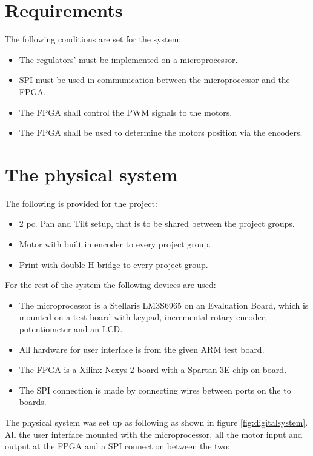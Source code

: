 \section{Requirements}

The following conditions are set for the system:
\begin{itemize}
\item The regulators' must be implemented on a microprocessor.
\item SPI must be used in communication between the microprocessor and the FPGA.
\item The FPGA shall control the PWM signals to the motors.
\item The FPGA shall be used to determine the motors position via the encoders.
\end{itemize}

\section{The physical system}

The following is provided for the project:

\begin{itemize}
\item 2 pc. Pan and Tilt setup, that is to be shared between the project groups.
\item Motor with built in encoder to every project group.
\item Print with double H-bridge to every project group.
\end{itemize}

For the rest of the system the following devices are used:

\begin{itemize}
\item The microprocessor is a Stellaris LM3S6965 on an Evaluation Board, which is mounted on a test board with keypad, incremental rotary encoder, potentiometer and an LCD.
\item All hardware for user interface is from the given ARM test board.
\item The FPGA is a Xilinx Nexys 2 board with a Spartan-3E chip on board.
\item The SPI connection is made by connecting wires between ports on the to boards.
\end{itemize}

The physical system was set up as following as shown in figure \ref{fig:digitalsystem}. All the user interface mounted with the microprocessor, all the motor input and output at the FPGA and a SPI connection between the two:

